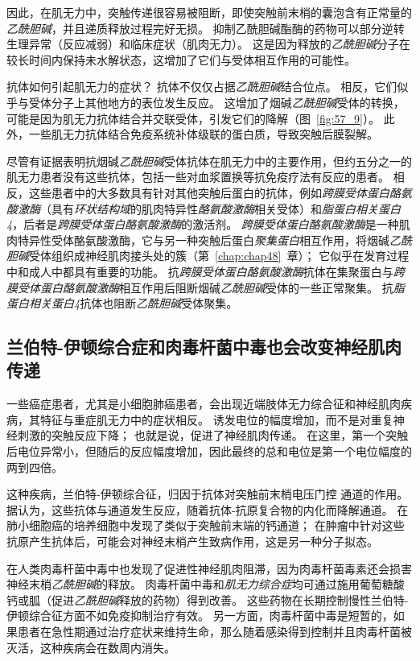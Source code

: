 因此，在肌无力中，突触传递很容易被阻断，即使突触前末梢的囊泡含有正常量的\textit{乙酰胆碱}，并且递质释放过程完好无损。
抑制乙酰胆碱酯酶的药物可以部分逆转生理异常（反应减弱）和临床症状（肌肉无力）。
这是因为释放的\textit{乙酰胆碱}分子在较长时间内保持未水解状态，这增加了它们与受体相互作用的可能性。


抗体如何引起肌无力的症状？
抗体不仅仅占据\textit{乙酰胆碱}结合位点。
相反，它们似乎与受体分子上其他地方的表位发生反应。
这增加了烟碱\textit{乙酰胆碱}受体的转换，可能是因为肌无力抗体结合并交联受体，引发它们的降解（图~\ref{fig:57_9}）。
此外，一些肌无力抗体结合免疫系统补体级联的蛋白质，导致突触后膜裂解。


尽管有证据表明抗烟碱\textit{乙酰胆碱}受体抗体在肌无力中的主要作用，但约五分之一的肌无力患者没有这些抗体，包括一些对血浆置换等抗免疫疗法有反应的患者。
相反，这些患者中的大多数具有针对其他突触后蛋白的抗体，例如\textit{跨膜受体蛋白酪氨酸激酶}（具有\textit{环状结构域}的肌肉特异性\textit{酪氨酸激酶}相关受体）和\textit{脂蛋白相关蛋白4}，后者是\textit{跨膜受体蛋白酪氨酸激酶}的激活剂。
\textit{跨膜受体蛋白酪氨酸激酶}是一种肌肉特异性受体酪氨酸激酶，它与另一种突触后蛋白\textit{聚集蛋白}相互作用，将烟碱\textit{乙酰胆碱}受体组织成神经肌肉接头处的簇（第~\ref{chap:chap48}~章）；
它似乎在发育过程中和成人中都具有重要的功能。
抗\textit{跨膜受体蛋白酪氨酸激酶}抗体在集聚蛋白与\textit{跨膜受体蛋白酪氨酸激酶}相互作用后阻断烟碱\textit{乙酰胆碱}受体的一些正常聚集。
抗\textit{脂蛋白相关蛋白4}抗体也阻断\textit{乙酰胆碱}受体聚集。



\subsection{兰伯特-伊顿综合症和肉毒杆菌中毒也会改变神经肌肉传递}

一些癌症患者，尤其是小细胞肺癌患者，会出现近端肢体无力综合征和神经肌肉疾病，其特征与重症肌无力中的症状相反。
诱发电位的幅度增加，而不是对重复神经刺激的突触反应下降；
也就是说，促进了神经肌肉传递。
在这里，第一个突触后电位异常小，但随后的反应幅度增加，因此最终的总和电位是第一个电位幅度的两到四倍。


这种疾病，兰伯特-伊顿综合征，归因于抗体对突触前末梢电压门控  通道的作用。
据认为，这些抗体与通道发生反应，随着抗体-抗原复合物的内化而降解通道。
在肺小细胞癌的培养细胞中发现了类似于突触前末端的钙通道；
在肿瘤中针对这些抗原产生抗体后，可能会对神经末梢产生致病作用，这是另一种分子拟态。


在人类肉毒杆菌中毒中也发现了促进性神经肌肉阻滞，因为肉毒杆菌毒素还会损害神经末梢\textit{乙酰胆碱}的释放。
肉毒杆菌中毒和\textit{肌无力综合症}均可通过施用葡萄糖酸钙或胍（促进\textit{乙酰胆碱}释放的药物）得到改善。
这些药物在长期控制慢性兰伯特-伊顿综合征方面不如免疫抑制治疗有效。
另一方面，肉毒杆菌中毒是短暂的，如果患者在急性期通过治疗症状来维持生命，那么随着感染得到控制并且肉毒杆菌被灭活，这种疾病会在数周内消失。




